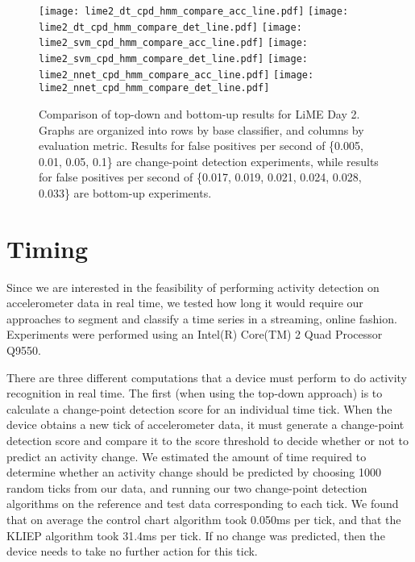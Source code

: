 \begin{figure}[h]
 \centering
 \texttt{[image: lime2\_dt\_cpd\_hmm\_compare\_acc\_line.pdf]} \hspace{1em}\vspace{1em}
 \texttt{[image: lime2\_dt\_cpd\_hmm\_compare\_det\_line.pdf]} 
 \texttt{[image: lime2\_svm\_cpd\_hmm\_compare\_acc\_line.pdf]} \hspace{1em}\vspace{1em}
 \texttt{[image: lime2\_svm\_cpd\_hmm\_compare\_det\_line.pdf]}
 \texttt{[image: lime2\_nnet\_cpd\_hmm\_compare\_acc\_line.pdf]} \hspace{1em}
 \texttt{[image: lime2\_nnet\_cpd\_hmm\_compare\_det\_line.pdf]}
 \caption{Comparison of top-down and bottom-up results for LiME Day 2.
  Graphs are organized into rows by base classifier, and columns by evaluation
  metric. Results for false positives per second of \{0.005, 0.01, 0.05, 0.1\} are change-point
  detection experiments, while results for false positives per second of
  \{0.017, 0.019, 0.021, 0.024, 0.028, 0.033\} are bottom-up experiments.}
 \label{fig:lime2_compare_cpd_hmm}
\end{figure}

\section{Timing}

Since we are interested in the feasibility of performing activity detection on
accelerometer data in real time, we tested how long it would require our
approaches to segment and classify a time series in a streaming, online fashion.
Experiments were performed using an Intel(R) Core(TM) 2 Quad Processor Q9550.

There are three different computations that a device must perform to do
activity recognition in real time. The first (when using the top-down approach)
is to calculate a change-point
detection score for an individual time tick. When the device obtains a new tick of
accelerometer data, it must generate a change-point detection score and compare
it to the score threshold to decide whether or not to predict an activity
change. We estimated the amount of time required to determine whether an
activity change should be predicted by choosing 1000 random ticks from our data,
and running our two change-point detection algorithms on the reference and test
data corresponding to each tick. We found that on average the control chart algorithm
took 0.050ms per tick, and that the KLIEP algorithm took 31.4ms per tick. If no change
was predicted, then the device needs to take no further action for this tick.

